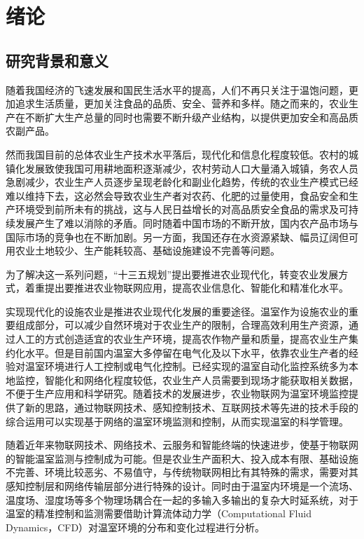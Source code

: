 

\chapter{绪论}
\label{chapter:Introduction}

\section{研究背景和意义}
随着我国经济的飞速发展和国民生活水平的提高，人们不再只关注于温饱问题，更加追求生活质量，更加关注食品的品质、安全、营养和多样。随之而来的，农业生产在不断扩大生产总量的同时也需要不断升级产业结构，以提供更加安全和高品质农副产品。

然而我国目前的总体农业生产技术水平落后，现代化和信息化程度较低。农村的城镇化发展致使我国可用耕地面积逐渐减少，农村劳动人口大量涌入城镇，务农人员急剧减少，农业生产人员逐步呈现老龄化和副业化趋势，传统的农业生产模式已经难以维持下去，这必然会导致农业生产者对农药、化肥的过量使用，食品安全和生产环境受到前所未有的挑战，这与人民日益增长的对高品质安全食品的需求及可持续发展产生了难以消除的矛盾。同时随着中国市场的不断开放，国内农产品市场与国际市场的竞争也在不断加剧。另一方面，我国还存在水资源紧缺、幅员辽阔但可用农业土地较少、生产能耗较高、基础设施建设不完善等问题。

为了解决这一系列问题，“十三五规划”提出要推进农业现代化，转变农业发展方式，着重提出要推进农业物联网应用，提高农业信息化、智能化和精准化水平。

实现现代化的设施农业是推进农业现代化发展的重要途径。温室作为设施农业的重要组成部分，可以减少自然环境对于农业生产的限制，合理高效利用生产资源，通过人工的方式创造适宜的农业生产环境，提高农作物产量和质量，提高农业生产集约化水平。但是目前国内温室大多停留在电气化及以下水平，依靠农业生产者的经验对温室环境进行人工控制或电气化控制。已经实现的温室自动化监控系统多为本地监控，智能化和网络化程度较低，农业生产人员需要到现场才能获取相关数据，不便于生产应用和科学研究。随着技术的发展进步，农业物联网为温室环境监控提供了新的思路，通过物联网技术、感知控制技术、互联网技术等先进的技术手段的综合运用可以实现基于网络的温室环境监测和控制，从而实现温室的科学管理。

随着近年来物联网技术、网络技术、云服务和智能终端的快速进步，使基于物联网的智能温室监测与控制成为可能。但是农业生产面积大、投入成本有限、基础设施不完善、环境比较恶劣、不易值守，与传统物联网相比有其特殊的需求，需要对其感知控制层和网络传输层部分进行特殊的设计。同时由于温室内环境是一个流场、温度场、湿度场等多个物理场耦合在一起的多输入多输出的复杂大时延系统，对于温室的精准控制和监测需要借助计算流体动力学（Computational Fluid Dynamics，CFD）对温室环境的分布和变化过程进行分析。

